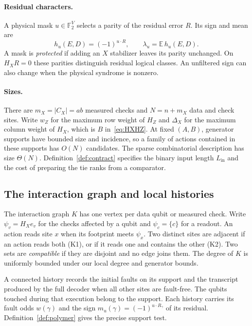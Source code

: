 \documentclass[10pt,twocolumn]{article}
\theoremstyle{definition}
\newcommand{\Ftwo}{\mathbb{F}_2}
\newcommand{\Lin}{L_{\mathrm{in}}}
\begin{document}
\paragraph{Residual characters.}
A physical mask $u\in\Ftwo^V$ selects a parity of the residual error $R$.
Its sign and mean are
\begin{equation}\label{eq:character}
 h_u(E,D)=(-1)^{u\cdot R},\qquad \lambda_u=\mathbb E\,h_u(E,D).
\end{equation}
A mask is \emph{protected} if adding an $X$ stabilizer leaves its parity
unchanged. On $H_XR=0$ these parities distinguish residual logical classes.
An unfiltered sign can also change when the physical syndrome is nonzero.

\paragraph{Sizes.} There are $m_X=|C_X|=ab$ measured checks and
$N=n+m_X$ data and check sites. Write $w_Z$ for the maximum row
weight of $H_Z$ and $\Delta_X$ for the maximum column weight of $H_X$,
which is $B$ in~\eqref{eq:HXHZ}. At fixed $(A,B)$, generator supports
have bounded size and incidence, so a family of actions contained in
these supports has $O(N)$ candidates. The sparse combinatorial
description has size $\Theta(N)$. Definition~\ref{def:contract}
specifies the binary input length $\Lin$ and the cost of preparing
the tie ranks from a comparator.

\subsection{The interaction graph and local histories}

The interaction graph $K$ has one vertex per data qubit or measured
check. Write $\psi_v=H_Xe_v$ for the checks affected by a qubit and
$\psi_c=\{c\}$ for a readout. An action reads site $x$ when its
footprint meets $\psi_x$. Two distinct sites are adjacent if an action reads
both (K1), or if it reads one and contains the other (K2). Two sets are
\emph{compatible} if they are disjoint and no edge joins them.
The degree of $K$ is uniformly bounded under our local degree and
generator bounds.

A connected history records the initial faults on its support and
the transcript produced by the full decoder when all other sites
are fault-free. The qubits touched during that execution belong to
the support. Each history carries its fault odds $w(\gamma)$ and
the sign $m_u(\gamma)=(-1)^{u\cdot R_\gamma}$ of its residual.
Definition~\ref{def:polymer} gives the precise support test.
\end{document}
